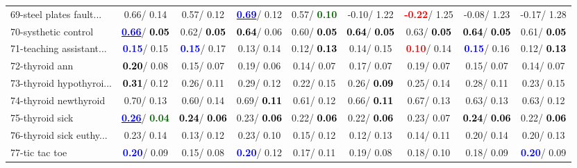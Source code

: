 \begin{table}[h]
\begin{center}
\begin{tabular}{lc|c|c|c|c|c|c|c}
69-steel plates fault... &   0.66/  0.14 &   0.57/  0.12 & \underline{\textcolor{blue}{\textbf{  0.69}}}/  0.12 &   0.57/\textcolor{darkgreen}{\textbf{  0.10}} &  -0.10/  1.22 & \textcolor{red}{\textbf{ -0.22}}/  1.25 &  -0.08/  1.23 &  -0.17/  1.28 \\
70-systhetic control & \underline{\textcolor{blue}{\textbf{  0.66}}}/\textcolor{black}{\textbf{  0.05}} &   0.62/\textcolor{black}{\textbf{  0.05}} & \textcolor{black}{\textbf{  0.64}}/  0.06 &   0.60/\textcolor{black}{\textbf{  0.05}} & \textcolor{black}{\textbf{  0.64}}/\textcolor{black}{\textbf{  0.05}} &   0.63/\textcolor{black}{\textbf{  0.05}} & \textcolor{black}{\textbf{  0.64}}/\textcolor{black}{\textbf{  0.05}} &   0.61/\textcolor{black}{\textbf{  0.05}} \\
71-teaching assistant... & \textcolor{blue}{\textbf{  0.15}}/  0.15 & \textcolor{blue}{\textbf{  0.15}}/  0.17 &   0.13/  0.14 &   0.12/\textcolor{black}{\textbf{  0.13}} &   0.14/  0.15 & \textcolor{red}{\textbf{  0.10}}/  0.14 & \textcolor{blue}{\textbf{  0.15}}/  0.16 &   0.12/\textcolor{black}{\textbf{  0.13}} \\ \hline
72-thyroid ann & \textcolor{black}{\textbf{  0.20}}/  0.08 &   0.15/  0.07 &   0.19/  0.06 &   0.14/  0.07 &   0.17/  0.07 &   0.19/  0.07 &   0.15/  0.07 &   0.14/  0.07 \\
73-thyroid hypothyroi... & \textcolor{black}{\textbf{  0.31}}/  0.12 &   0.26/  0.11 &   0.29/  0.12 &   0.22/  0.15 &   0.26/\textcolor{black}{\textbf{  0.09}} &   0.25/  0.14 &   0.28/  0.11 &   0.23/  0.15 \\
74-thyroid newthyroid &   0.70/  0.13 &   0.60/  0.14 &   0.69/\textcolor{black}{\textbf{  0.11}} &   0.61/  0.12 &   0.66/\textcolor{black}{\textbf{  0.11}} &   0.67/  0.13 &   0.63/  0.13 &   0.63/  0.12 \\
75-thyroid sick & \underline{\textcolor{blue}{\textbf{  0.26}}}/\textcolor{darkgreen}{\textbf{  0.04}} & \textcolor{black}{\textbf{  0.24}}/\textcolor{black}{\textbf{  0.06}} &   0.23/\textcolor{black}{\textbf{  0.06}} &   0.22/\textcolor{black}{\textbf{  0.06}} &   0.22/\textcolor{black}{\textbf{  0.06}} &   0.23/  0.07 & \textcolor{black}{\textbf{  0.24}}/\textcolor{black}{\textbf{  0.06}} &   0.22/\textcolor{black}{\textbf{  0.06}} \\
76-thyroid sick euthy... &   0.23/  0.14 &   0.13/  0.12 &   0.23/  0.10 &   0.15/  0.12 &   0.12/  0.13 &   0.14/  0.11 &   0.20/  0.14 &   0.20/  0.13 \\
77-tic tac toe & \textcolor{blue}{\textbf{  0.20}}/  0.09 &   0.15/  0.08 & \textcolor{blue}{\textbf{  0.20}}/  0.12 &   0.17/  0.11 &   0.19/  0.08 &   0.18/  0.10 &   0.18/  0.09 & \textcolor{blue}{\textbf{  0.20}}/  0.09 \\

\end{tabular}
\end{center}
\end{table}
